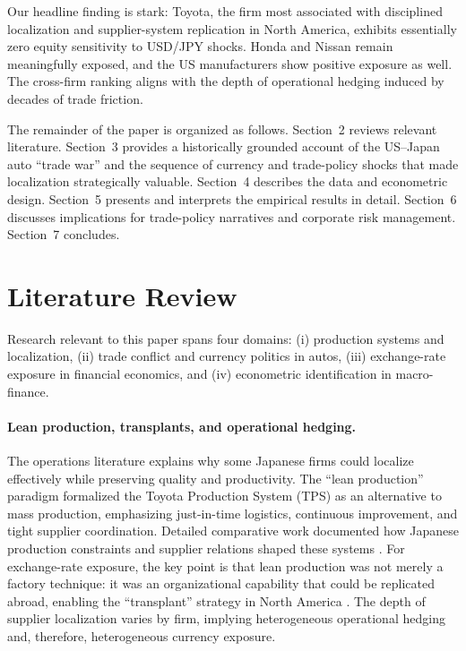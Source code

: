 \documentclass[12pt,a4paper]{article}
\begin{document}
Our headline finding is stark: Toyota, the firm most associated with disciplined localization and supplier-system replication in North America, exhibits essentially zero equity sensitivity to USD/JPY shocks. Honda and Nissan remain meaningfully exposed, and the US manufacturers show positive exposure as well. The cross-firm ranking aligns with the depth of operational hedging induced by decades of trade friction.

The remainder of the paper is organized as follows. Section~2 reviews relevant literature. Section~3 provides a historically grounded account of the US--Japan auto ``trade war'' and the sequence of currency and trade-policy shocks that made localization strategically valuable. Section~4 describes the data and econometric design. Section~5 presents and interprets the empirical results in detail. Section~6 discusses implications for trade-policy narratives and corporate risk management. Section~7 concludes.

\section{Literature Review}

Research relevant to this paper spans four domains: (i) production systems and localization, (ii) trade conflict and currency politics in autos, (iii) exchange-rate exposure in financial economics, and (iv) econometric identification in macro-finance.

\paragraph{Lean production, transplants, and operational hedging.}

The operations literature explains why some Japanese firms could localize effectively while preserving quality and productivity. The ``lean production'' paradigm \citep{womack1990} formalized the Toyota Production System (TPS) as an alternative to mass production, emphasizing just-in-time logistics, continuous improvement, and tight supplier coordination. Detailed comparative work documented how Japanese production constraints and supplier relations shaped these systems \citep{cusumano1985,ohno1988}. For exchange-rate exposure, the key point is that lean production was not merely a factory technique: it was an organizational capability that could be replicated abroad, enabling the ``transplant'' strategy in North America \citep{rubenstein1992}. The depth of supplier localization varies by firm, implying heterogeneous operational hedging and, therefore, heterogeneous currency exposure.
\end{document}
